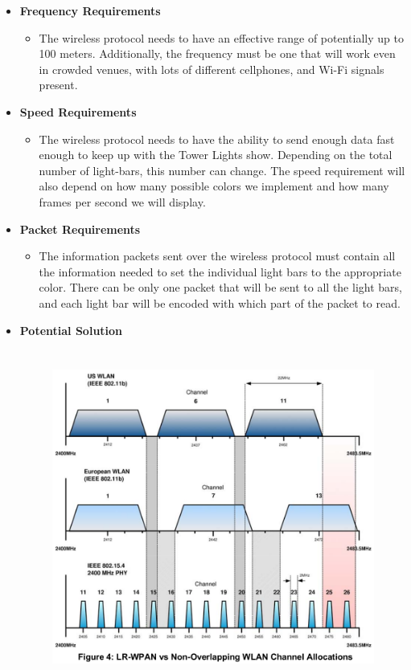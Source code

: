 \documentclass[12pt]{article}
\begin{document}
{{{{	%
	{\renewcommand\labelitemi{}
		\begin{itemize}
			\item \textbf{Frequency Requirements}
			\begin{itemize}
				\item The wireless protocol needs to have an effective range of potentially up to 100 meters. Additionally, the
				frequency must be one that will work even in crowded venues, with lots of different cellphones, and
				Wi-Fi signals present.
			\end{itemize}
			\item \textbf{Speed Requirements}
			\begin{itemize}
				\item The wireless protocol needs to have the ability to send enough data fast enough to keep up with the
				Tower Lights show. Depending on the total number of light-bars, this number can change. The speed
				requirement will also depend on how many possible colors we implement and how many frames per
				second we will display.
			\end{itemize}
			\item \textbf{Packet Requirements}
			\begin{itemize}
				\item The information packets sent over the wireless protocol must contain all the information needed to set
				the individual light bars to the appropriate color. There can be only one packet that will be sent to all
				the light bars, and each light bar will be encoded with which part of the packet to read.
			\end{itemize}
			\item \textbf{Potential Solution}
				\begin{figure}[!htb]
					\centering
					\includegraphics[height = 110mm]{assets/Zigbee.png}

\end{figure}
\end{itemize}}}}}}
\end{document}
